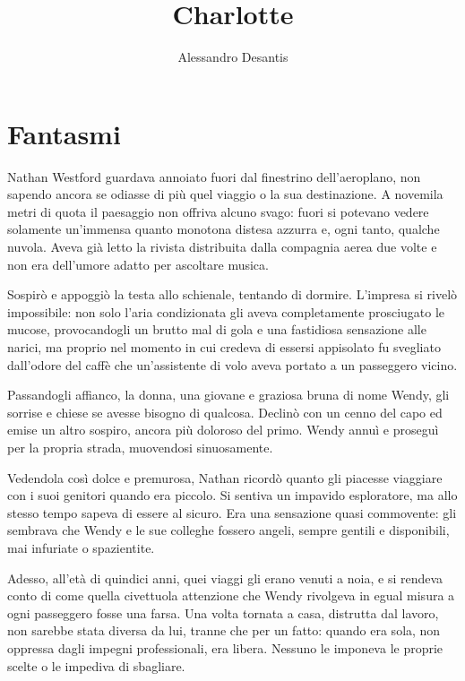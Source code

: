 \documentclass[a4paper,oneside,11pt]{memoir}
\title{Charlotte}
\author{Alessandro Desantis}
\date{}
\begin{document}
\begin{titlingpage}
\maketitle
\end{titlingpage}

\chapter{Fantasmi}

Nathan Westford guardava annoiato fuori dal finestrino dell'aeroplano, non sapendo ancora se odiasse di più quel
viaggio o la sua destinazione. A novemila metri di quota il paesaggio non offriva alcuno svago: fuori si potevano vedere
solamente un'immensa quanto monotona distesa azzurra e, ogni tanto, qualche nuvola. Aveva già letto la rivista
distribuita dalla compagnia aerea due volte e non era dell'umore adatto per ascoltare musica.

Sospirò e appoggiò la testa allo schienale, tentando di dormire. L'impresa si rivelò impossibile: non solo l'aria
condizionata gli aveva completamente prosciugato le mucose, provocandogli un brutto mal di gola e una fastidiosa
sensazione alle narici, ma proprio nel momento in cui credeva di essersi appisolato fu svegliato dall'odore del caffè
che un'assistente di volo aveva portato a un passeggero vicino.

Passandogli affianco, la donna, una giovane e graziosa bruna di nome Wendy, gli sorrise e chiese se avesse bisogno di
qualcosa. Declinò con un cenno del capo ed emise un altro sospiro, ancora più doloroso del primo. Wendy annuì e
proseguì per la propria strada, muovendosi sinuosamente.

Vedendola così dolce e premurosa, Nathan ricordò quanto gli piacesse viaggiare con i suoi genitori quando era piccolo.
Si sentiva un impavido esploratore, ma allo stesso tempo sapeva di essere al sicuro. Era una sensazione quasi
commovente: gli sembrava che Wendy e le sue colleghe fossero angeli, sempre gentili e disponibili, mai infuriate o
spazientite.

Adesso, all'età di quindici anni, quei viaggi gli erano venuti a noia, e si rendeva conto di come quella civettuola
attenzione che Wendy rivolgeva in egual misura a ogni passeggero fosse una farsa. Una volta tornata a casa, distrutta
dal lavoro, non sarebbe stata diversa da lui, tranne che per un fatto: quando era sola, non oppressa dagli impegni
professionali, era libera. Nessuno le imponeva le proprie scelte o le impediva di sbagliare.
\end{document}
